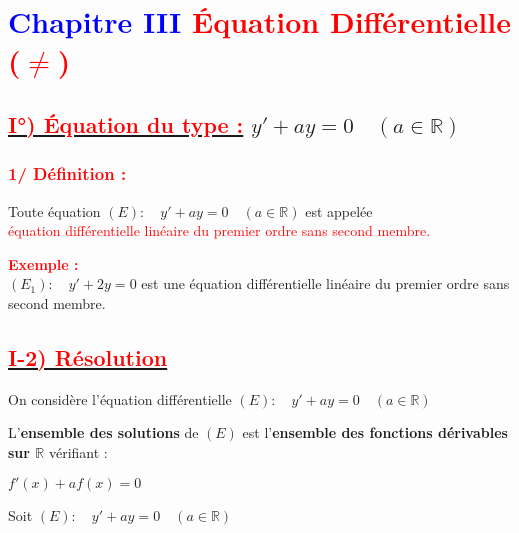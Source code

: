 \documentclass[12pt]{article}
\begin{document}
\section*{\textcolor{blue}{Chapitre III} \hfill \textcolor{red}{Équation Différentielle (\(\neq\))}}

\subsection*{\underline{\textcolor{red}{I°) Équation du type :}} \quad \( y' + ay = 0 \quad (a \in \mathbb{R}) \)}

\subsubsection*{\textcolor{red}{1/ Définition :}}

Toute équation \((E):\quad y' + ay = 0 \quad (a \in \mathbb{R})\) est appelée \\
\textcolor{red}{équation différentielle linéaire du premier ordre sans second membre.}

\vspace{0.5cm}

\textbf{\textcolor{red}{Exemple :}} \\
\((E_1):\quad y' + 2y = 0\) est une équation différentielle linéaire du premier ordre sans second membre.

\subsection*{\underline{\textcolor{red}{I-2) Résolution}}}

On considère l'équation différentielle \((E) :\quad y' + ay = 0 \quad (a \in \mathbb{R})\)

\vspace{0.3cm}

L'\textbf{ensemble des solutions} de \((E)\) est l'\textbf{ensemble des fonctions dérivables sur \(\mathbb{R}\)} vérifiant :
\begin{center}
    \begin{tcolorbox}[colback=white, colframe=red, sharp corners=southwest, boxrule=0.7pt]
        \( f'(x) + af(x) = 0 \)
    \end{tcolorbox}
\end{center}

\vspace{0.3cm}

Soit \((E):\quad y' + ay = 0 \quad (a \in \mathbb{R})\)
\end{document}
